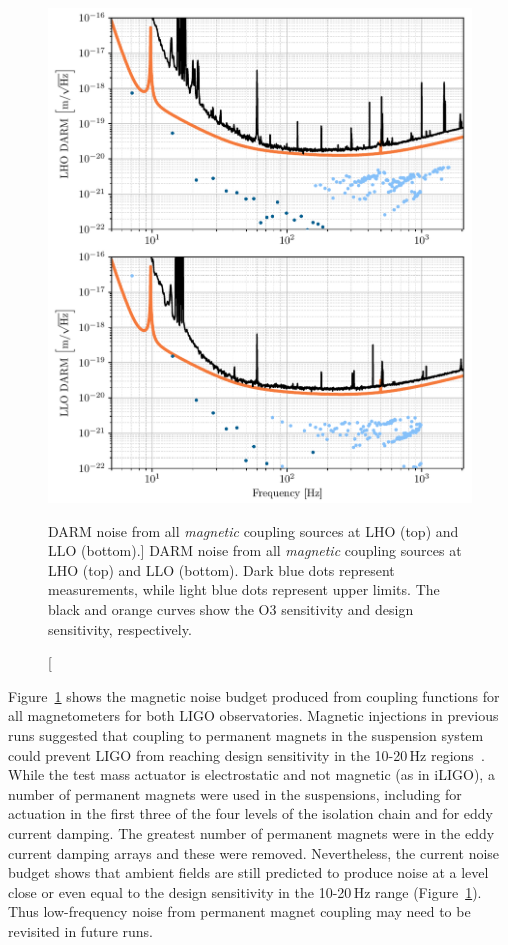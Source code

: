\begin{figure}
	\centering
	\includegraphics{figures/noise-studies/mag-ambient.pdf}
	\caption
	[DARM noise from all \textit{magnetic} coupling sources at LHO (top) and LLO (bottom).]
	{DARM noise from all \textit{magnetic} coupling sources at LHO (top) and LLO (bottom).
	 Dark blue dots represent measurements, while light blue dots represent upper limits.
	 The black and orange curves show the O3 sensitivity and design sensitivity, respectively.
	 }
	\label{fig:mag-ambient}
\end{figure}

Figure~\ref{fig:mag-ambient} shows the magnetic noise budget produced from coupling functions for all magnetometers for both LIGO observatories.
Magnetic injections in previous runs suggested that coupling to permanent magnets in the suspension system could prevent \ac{LIGO} from reaching design sensitivity in the 10-20\,Hz regions~\citep{Schofield_2013}.
While the test mass actuator is electrostatic and not magnetic (as in \ac{iLIGO}), a number of permanent magnets were used in the suspensions, including for actuation in the first three of the four levels of the isolation chain and for eddy current damping.
The greatest number of permanent magnets were in the eddy current damping arrays and these were removed.
Nevertheless, the current noise budget shows that ambient fields are still predicted to produce noise at a level close or even equal to the design sensitivity in the 10-20\,Hz range (Figure~\ref{fig:mag-ambient}).
Thus low-frequency noise from permanent magnet coupling may need to be revisited in future runs.

